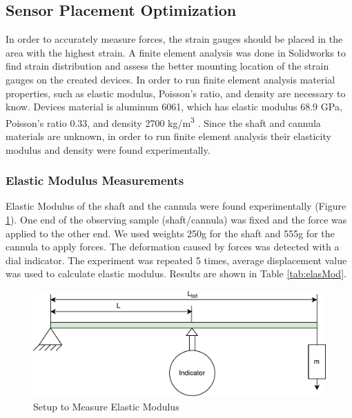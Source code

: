 \subsection{Sensor Placement Optimization}

In order to accurately measure forces, the strain gauges should be placed in the area with the highest strain. A finite element analysis was done in Solidworks to find strain distribution and assess the better mounting location of the strain gauges on the created devices. In order to run finite element analysis material properties, such as elastic modulus, Poisson's ratio, and density are necessary to know. Devices material is aluminum 6061, which has elastic modulus 68.9 GPa, Poisson's ratio 0.33, and density 2700 kg/m\textsuperscript{3} \cite{aluminum_properties}. Since the shaft and cannula materials are unknown, in order to run finite element analysis their elasticity modulus and density were found experimentally.
	
	\subsubsection{Elastic Modulus Measurements}
	\label{sec:ElasMod}
	Elastic Modulus of the shaft and the cannula were found experimentally (Figure \ref{fig:ElasModSet}). One end of the observing sample (shaft/cannula) was fixed and the force was applied to the other end. We used weights 250g for the shaft and 555g for the cannula to apply forces. The deformation caused by forces was detected with a dial indicator. The experiment was repeated 5 times, average displacement value was used to calculate elastic modulus. Results are shown in Table \ref{tab:elasMod}.
	
\begin{figure}[h]
	\begin{center}
		\includegraphics[width=120mm]{fig/methods/el_mod_set.pdf}
	\end{center}
	\vspace{-4mm}
	\caption[Setup to Measure Elastic Modulus]
	{Setup to Measure Elastic Modulus}
	\label{fig:ElasModSet}
	\vspace{-2mm}
\end{figure}

